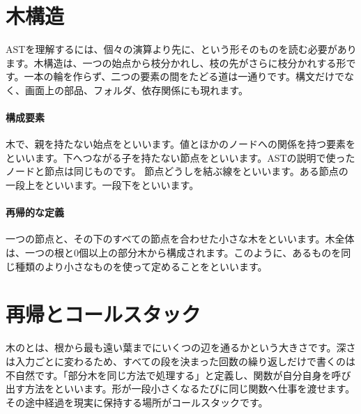 \par
\endgroup
\par
\endgroup


\section{木構造}
\label{sec:02-language-09}

ASTを理解するには、個々の演算より先に、という形そのものを読む必要があります。木構造は、一つの始点から枝分かれし、枝の先がさらに枝分かれする形です。一本の輪を作らず、二つの要素の間をたどる道は一通りです。構文だけでなく、画面上の部品、フォルダ、依存関係にも現れます。

\begingroup
\begingroup
\paragraph{構成要素}
        木で、親を持たない始点をといいます。値とほかのノードへの関係を持つ要素をといいます。下へつながる子を持たない節点をといいます。ASTの説明で使ったノードと節点は同じものです。
        節点どうしを結ぶ線をといいます。ある節点の一段上をといいます。一段下をといいます。

\paragraph{再帰的な定義}
        一つの節点と、その下のすべての節点を合わせた小さな木をといいます。木全体は、一つの根と0個以上の部分木から構成されます。このように、あるものを同じ種類のより小さなものを使って定めることをといいます。

\par
\endgroup
\medskip
\begingroup
      \centering
\par
\endgroup
\par
\endgroup


\section{再帰とコールスタック}
\label{sec:02-language-10}

木のとは、根から最も遠い葉までにいくつの辺を通るかという大きさです。深さは入力ごとに変わるため、すべての段を決まった回数の繰り返しだけで書くのは不自然です。「部分木を同じ方法で処理する」と定義し、関数が自分自身を呼び出す方法をといいます。形が一段小さくなるたびに同じ関数へ仕事を渡せます。その途中経過を現実に保持する場所がコールスタックです。

